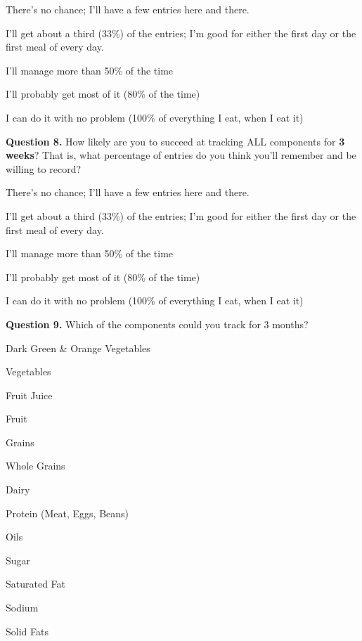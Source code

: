 \begin{itemize*}
\item	There's no chance; I'll have a few entries here and there.
\item	I'll get about a third (33\%) of the entries; I'm good for either the first day or the first meal of every day.
\item	I'll manage more than 50\% of the time
\item	I'll probably get most of it (80\% of the time)
\item	I can do it with no problem (100\% of everything I eat, when I eat it)
\end{itemize*}

\noindent\textbf{Question 8.}
How likely are you to succeed at tracking ALL components for \textbf{3 weeks}? That is, what percentage of entries do you think you'll remember and be willing to record? 

\begin{itemize*}
\item	There's no chance; I'll have a few entries here and there.
\item	I'll get about a third (33\%) of the entries; I'm good for either the first day or the first meal of every day.
\item	I'll manage more than 50\% of the time
\item	I'll probably get most of it (80\% of the time)
\item	I can do it with no problem (100\% of everything I eat, when I eat it)
\end{itemize*}

\noindent\textbf{Question 9.}
Which of the components could you track for 3 months? 

\begin{itemize*}
\item Dark Green \& Orange Vegetables
\item	Vegetables
\item	Fruit Juice
\item	Fruit
\item	Grains
\item	Whole Grains
\item	Dairy
\item	Protein (Meat, Eggs, Beans)
\item	Oils
\item	Sugar
\item	Saturated Fat
\item	Sodium
\item	Solid Fats
\end{itemize*}

